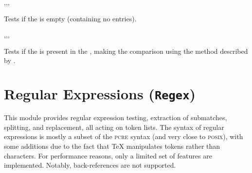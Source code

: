 \documentclass[oneside]{book}
\begin{document}
\begin{function}{\propVarIfEmpty,\propVarIfEmptyT,\propVarIfEmptyF,\propVarIfEmptyTF}
\begin{syntax}
 
  
  
   
\end{syntax}
Tests if the  is empty (containing no entries).
\begin{demohigh}
\propSetFromKeyval {}
\propVarIfEmptyTF {} {}
\propClear \lTmpaProp
\propVarIfEmptyTF {} {}
\end{demohigh}
\end{function}

\begin{function}{\propVarIfIn,\propVarIfInT,\propVarIfInF,\propVarIfInTF}
\begin{syntax}
  
   
   
    
\end{syntax}
Tests if the  is present in the ,
making the comparison using the method described by .
\begin{demohigh}
\propSetFromKeyval {}
\propVarIfInTF {} {} {}
\propVarIfInTF {} {} {}
\end{demohigh}
\end{function}

\chapter{Regular Expressions (\texttt{Regex})}

This module provides regular expression testing,
extraction of submatches, splitting, and replacement, all acting
on token lists. The syntax of regular expressions is mostly a subset
of the \textsc{pcre} syntax (and very close to \textsc{posix}),
with some additions
due to the fact that \TeX{} manipulates tokens rather than characters.
For performance reasons, only a limited set of features are implemented.
Notably, back-references are not supported.
\end{document}
